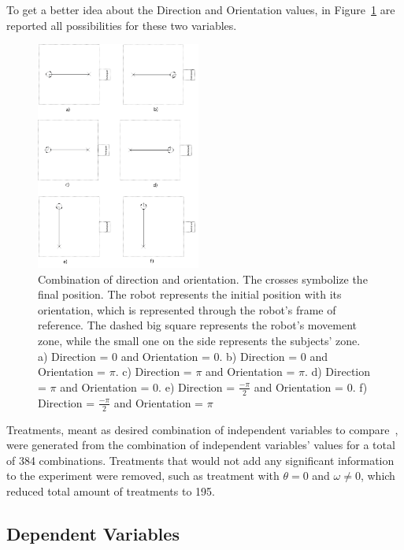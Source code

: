 To get a better idea about the Direction and Orientation values, in Figure~\ref{fig:possibilities_orientation_direction} are reported all  possibilities for these two variables.

\begin{figure}
	\centering
	\includegraphics[width=0.48\textwidth]{./Images/possibilities_case.png} 
	\caption{Combination of direction and orientation. The crosses symbolize the final position. The robot represents the initial position with its orientation, which is represented through the robot's frame of reference. The dashed big square represents the robot's movement zone, while the small one on the side represents the subjects' zone. a) Direction = $0$ and Orientation = $0$. b) Direction = $0$ and Orientation = $\pi$. c) Direction = $\pi$ and Orientation = $\pi$. d) Direction = $\pi$ and Orientation = $0$. e) Direction = $\frac{-\pi}{2}$ and Orientation = $0$. f) Direction = $\frac{-\pi}{2}$ and Orientation = $\pi$}
	\label{fig:possibilities_orientation_direction}
\end{figure}

Treatments, meant as desired combination of independent variables to compare~\cite{oehlert2000first},
were generated from the combination of independent variables' values for a total of 384 combinations. Treatments that would not add any significant information to the experiment were removed, such as treatment with $\theta=0$ and $\omega \neq 0$, which reduced total amount of treatments to 195.

\subsection{Dependent Variables}

